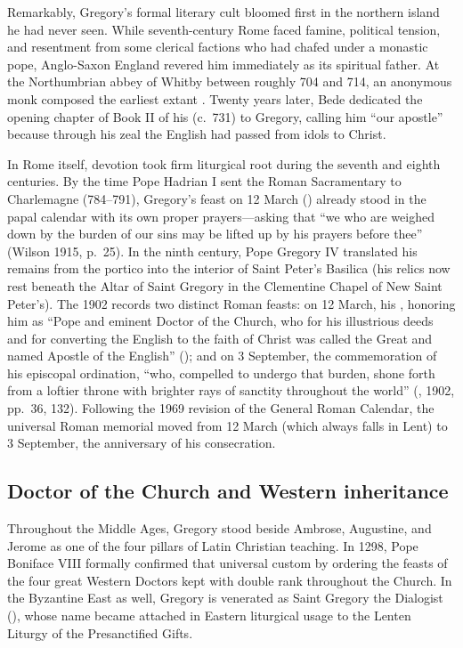 Remarkably, Gregory's formal literary cult bloomed first in the northern island
he had never seen. While seventh-century Rome faced famine, political tension,
and resentment from some clerical factions who had chafed under a monastic
pope, Anglo-Saxon England revered him immediately as its spiritual father. At
the Northumbrian abbey of Whitby between roughly 704 and 714, an anonymous
monk composed the earliest extant . Twenty years later,
Bede dedicated the opening chapter of Book II of his  (c.\ 731) to Gregory, calling him ``our apostle'' because
through his zeal the English had passed from idols to Christ.

In Rome itself, devotion took firm liturgical root during the seventh and
eighth centuries. By the time Pope Hadrian I sent the Roman Sacramentary to
Charlemagne (784--791), Gregory's feast on 12 March () already stood in the papal calendar with its own proper
prayers---asking that ``we who are weighed down by the burden of our sins may
be lifted up by his prayers before thee'' (Wilson 1915, p.\ 25). In the ninth
century, Pope Gregory IV translated his remains from the portico into the
interior of Saint Peter's Basilica (his relics now rest beneath the Altar of
Saint Gregory in the Clementine Chapel of New Saint Peter's). The 1902
 records two distinct Roman feasts: on 12 March,
his , honoring him as ``Pope and eminent Doctor of the
Church, who for his illustrious deeds and for converting the English to the
faith of Christ was called the Great and named Apostle of the English''
(); and on 3
September, the commemoration of his episcopal ordination, ``who, compelled to
undergo that burden, shone forth from a loftier throne with brighter rays of
sanctity throughout the world'' (, 1902, pp.\ 36,
132). Following the 1969 revision of the General Roman Calendar, the universal
Roman memorial moved from 12 March (which always falls in Lent) to 3 September,
the anniversary of his consecration.

\subsection{Doctor of the Church and Western inheritance}

Throughout the Middle Ages, Gregory stood beside Ambrose, Augustine, and
Jerome as one of the four pillars of Latin Christian teaching. In 1298, Pope
Boniface VIII formally confirmed that universal custom by ordering the feasts
of the four great Western Doctors kept with double rank throughout the Church.
In the Byzantine East as well, Gregory is venerated as Saint Gregory
the Dialogist (), whose name became attached in Eastern
liturgical usage to the Lenten Liturgy of the Presanctified Gifts.

